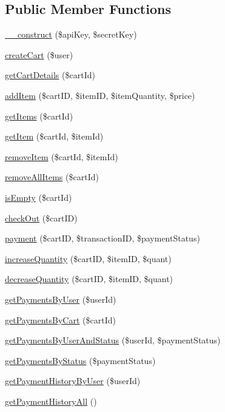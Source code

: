 \subsection*{Public Member Functions}
\begin{DoxyCompactItemize}
\item 
\hyperlink{class_cart_service_a49f2ad222e06420736d750e167d55d7c}{\+\_\+\+\_\+construct} (\$api\+Key, \$secret\+Key)
\item 
\hyperlink{class_cart_service_a8d3e000e20e420c9319514edf5799f91}{create\+Cart} (\$user)
\item 
\hyperlink{class_cart_service_a053d64dd52b3d25178370ed237d63e71}{get\+Cart\+Details} (\$cart\+Id)
\item 
\hyperlink{class_cart_service_a681ec91e10e412828b2a0cbe762d66ae}{add\+Item} (\$cart\+I\+D, \$item\+I\+D, \$item\+Quantity, \$price)
\item 
\hyperlink{class_cart_service_a722a832e305223acf4cce810914c769a}{get\+Items} (\$cart\+Id)
\item 
\hyperlink{class_cart_service_abe1e9bfa16445ccfeb1a7d31aebe3572}{get\+Item} (\$cart\+Id, \$item\+Id)
\item 
\hyperlink{class_cart_service_a806f2debb6c778488622049e61c65445}{remove\+Item} (\$cart\+Id, \$item\+Id)
\item 
\hyperlink{class_cart_service_a334dd3558351b5b6efd10b3e98a2a76a}{remove\+All\+Items} (\$cart\+Id)
\item 
\hyperlink{class_cart_service_a8bb3b9e014273a695a2eba1437597f5a}{is\+Empty} (\$cart\+Id)
\item 
\hyperlink{class_cart_service_ad04fbb47a6c4d23bdba2a81c36fae536}{check\+Out} (\$cart\+I\+D)
\item 
\hyperlink{class_cart_service_a9b025b6fa1ad69b332168bb5161e8712}{payment} (\$cart\+I\+D, \$transaction\+I\+D, \$payment\+Status)
\item 
\hyperlink{class_cart_service_acfad04e6064d8ec02d81828ba0e2a043}{increase\+Quantity} (\$cart\+I\+D, \$item\+I\+D, \$quant)
\item 
\hyperlink{class_cart_service_a52b92a1e9621ade18ae387b0f8a83657}{decrease\+Quantity} (\$cart\+I\+D, \$item\+I\+D, \$quant)
\item 
\hyperlink{class_cart_service_a0b074871b48dfbd111fa1abafaf52127}{get\+Payments\+By\+User} (\$user\+Id)
\item 
\hyperlink{class_cart_service_acc29ff8c51dbdc5cc4fedd0bccedd6e5}{get\+Payments\+By\+Cart} (\$cart\+Id)
\item 
\hyperlink{class_cart_service_a596571b50eef106130ad60e0c97e1b11}{get\+Payments\+By\+User\+And\+Status} (\$user\+Id, \$payment\+Status)
\item 
\hyperlink{class_cart_service_a5be28175c0615ac0b471b52ae231fea3}{get\+Payments\+By\+Status} (\$payment\+Status)
\item 
\hyperlink{class_cart_service_ab06f64799f564c95dbd61fb9ecdf4db8}{get\+Payment\+History\+By\+User} (\$user\+Id)
\item 
\hyperlink{class_cart_service_a03b2ed3bfb499643dfed706a4bd96ff5}{get\+Payment\+History\+All} ()
\end{DoxyCompactItemize}
